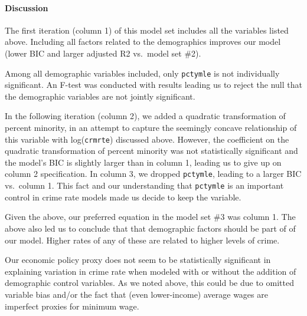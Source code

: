 \documentclass[]{article}
\let\oldparagraph\paragraph
\renewcommand{\paragraph}[1]{\oldparagraph{#1}\mbox{}}
\begin{document}
\hypertarget{discussion-2}{%
\paragraph{Discussion}\label{discussion-2}}

The first iteration (column 1) of this model set includes all the
variables listed above. Including all factors related to the
demographics improves our model (lower BIC and larger adjusted R2
vs.~model set \#2).

Among all demographic variables included, only \texttt{pctymle} is not
individually significant. An F-test was conducted with results leading
us to reject the null that the demographic variables are not jointly
significant.

In the following iteration (column 2), we added a quadratic
transformation of percent minority, in an attempt to capture the
seemingly concave relationship of this variable with
log(\texttt{crmrte}) discussed above. However, the coefficient on the
quadratic transformation of percent minority was not statistically
significant and the model's BIC is slightly larger than in column 1,
leading us to give up on column 2 specification. In column 3, we dropped
\texttt{pctymle}, leading to a larger BIC vs.~column 1. This fact and
our understanding that \texttt{pctymle} is an important control in crime
rate models made us decide to keep the variable.

Given the above, our preferred equation in the model set \#3 was column
1. The above also led us to conclude that that demographic factors
should be part of of our model. Higher rates of any of these are related
to higher levels of crime.

Our economic policy proxy does not seem to be statistically significant
in explaining variation in crime rate when modeled with or without the
addition of demographic control variables. As we noted above, this could
be due to omitted variable bias and/or the fact that (even lower-income)
average wages are imperfect proxies for minimum wage.
\end{document}
